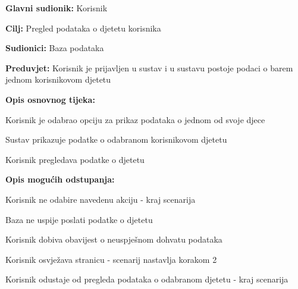 					\noindent {}
					\begin{packed_item}
	
						\item \textbf{Glavni sudionik: }Korisnik
						\item  \textbf{Cilj:} Pregled podataka o djetetu korisnika
						\item  \textbf{Sudionici:} Baza podataka
						\item  \textbf{Preduvjet:} Korisnik je prijavljen u sustav i u sustavu postoje podaci o barem jednom korisnikovom djetetu
						\eject
						\item  \textbf{Opis osnovnog tijeka:}
						
						\item[] \begin{packed_enum}
							\item Korisnik je odabrao opciju za prikaz podataka o jednom od svoje djece
							\item Sustav prikazuje podatke o odabranom korisnikovom djetetu
							\item Korisnik pregledava podatke o djetetu
						\end{packed_enum}
						\item  \textbf{Opis mogućih odstupanja:}

						\item[] \begin{packed_item}
							\item[1.a] Korisnik ne odabire navedenu akciju - kraj scenarija
							\item[2.a] Baza ne uspije poslati podatke o djetetu
							\item[] \begin{packed_enum}	
								\item Korisnik dobiva obavijest o neuspješnom dohvatu podataka
								\item
									\begin{packed_enum}
										\item Korisnik osvježava stranicu - scenarij nastavlja korakom 2
										\item Korisnik odustaje od pregleda podataka o odabranom djetetu - kraj scenarija
									\end{packed_enum}	
							\end{packed_enum}	
						\end{packed_item}	
					\end{packed_item}

